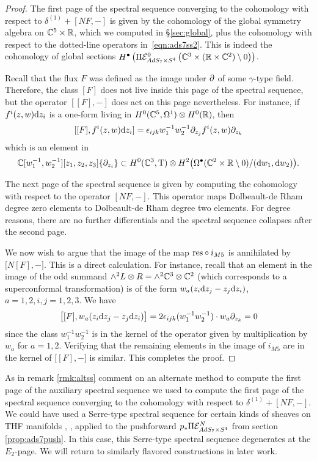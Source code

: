 \begin{proof}
The first page of the spectral sequence converging to the cohomology with respect to $\delta^{(1)} + [N F, -]$ is given by the cohomology of the global symmetry algebra on $\mathbb{C}^5 \times \mathbb{R}$, which we computed in \S \ref{sec:global}, plus the cohomology with respect to the dotted-line operators in~\eqref{eqn:ads7ss2}. This is indeed the cohomology of global sections $H^\bullet \left ( \Pi \mathcal{E}^0 _{AdS_7\times S^4} \left ( \mathbb{C}^3\times (\mathbb{R}\times \mathbb{C}^2)\setminus 0\right )\right )$.

Recall that the flux $F$ was defined as the image under $\partial$ of some $\gamma$-type field. Therefore, the class $[F]$ does not live inside this page of the spectral sequence, but the operator $[[F], -]$ does act on this page nevertheless. For instance, if $f^i(z,w) \mathrm{d} z_i$ is a one-form living in $H^0(\mathbb{C}^5, \Omega^1) \otimes H^0(\mathbb{R})$, then
\[
[ [F] , f^i (z,w) \mathrm{d} z_i ] = \epsilon_{ijk} w_1^{-1} w_2^{-1} \partial_{z_j} f^i(z,w) \partial_{z_k} 
\]
which is an element in 
\[
\mathbb{C}[w_1^{-1}, w_2^{-1}][z_1,z_2,z_3] \{\partial_{z_i}\} \subset H^0(\mathbb{C}^3, {\mathrm{T}}) \otimes H^2 \big(\Omega^\bullet(\mathbb{C}^2 \times \mathbb{R} \setminus 0) / (\mathrm{d} w_1 , \mathrm{d} w_2) \big) .
\]

The next page of the spectral sequence is given by computing the cohomology with respect to the operator $[N F,-]$. This operator maps Dolbeault-de Rham degree zero elements to Dolbeault-de Rham degree two elements. For degree reasons, there are no further differentials and the spectral sequence collapses after the second page. 

We now wish to argue that the image of the map $\mathrm{res}\circ i_{M5}$ is annihilated by $\big[ N [F] , - \big]$. This is a direct calculation. For instance, recall that an element in the image of the odd summand $\wedge^2 L \otimes R = \wedge^2 \mathbb{C}^3 \otimes \mathbb{C}^2$ (which corresponds to a superconformal transformation) is of the form $w_a (z_i \mathrm{d} z_j - z_j \mathrm{d} z_i)$, $a=1,2, i,j=1,2,3$. 
We have
\[
\big[[F] , w_a (z_i \mathrm{d} z_j - z_j \mathrm{d} z_i)\big] = 2 \epsilon_{ijk} (w_1^{-1} w_2^{-1}) \cdot w_a \partial_{z_k} = 0
\]
since the class $w_1^{-1} w_2^{-1}$ is in the kernel of the operator given by multiplication by $w_a$ for $a=1,2$.
Verifying that the remaining elements in the image of $i_{M5}$ are in the kernel of $\big[ [F], -\big]$ is similar.
This completes the proof.
\end{proof}

\begin{rmk}
As in remark \ref{rmk:altss} comment on an alternate method to compute the first page of the auxiliary spectral sequence we used to compute the first page of the spectral sequence converging to the cohomology with respect to $\delta^{(1)} + [NF, - ]$. We could have used a Serre-type spectral sequence for certain kinds of sheaves on THF manifolds \cite{KamberTondeur}, \cite{KormanThesis}, applied to the pushforward $ p_* \Pi \mathcal{E}^N_{AdS_7\times S^4}$ from section \ref{prop:ads7push}. In this case, this Serre-type spectral sequence degenerates at the $E_2$-page. We will return to similarly flavored constructions in later work.
\end{rmk}
